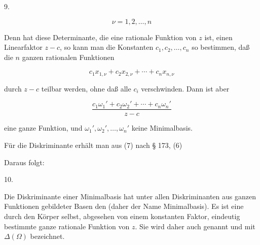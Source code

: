 9. 

\[
\nu = 1, 2, \ldots, n
\]




Denn hat diese Determinante, die eine rationale Funktion
von $z$ ist, einen Linearfaktor $z - c$, so kann man die Konstanten
$c_1, c_2, \ldots, c_n$ so bestimmen, daß die $n$ ganzen rationalen Funktionen


\[
c_1 x_{1,\nu} + c_2 x_{2,\nu} + \cdots + c_n x_{n,\nu}
\]

durch $z - c$ teilbar werden, ohne daß alle $c_i$ verschwinden.
Dann ist aber

\[
\frac{c_1 \omega_1' + c_2 \omega_2' + \cdots + c_n \omega_n'}{z - c}
\]

eine ganze Funktion, und $\omega_1', \omega_2', \ldots, \omega_n'$ keine Minimalbasis.

Für die Diskriminante erhält man aus (7) nach § 173, (6)


Daraus folgt:

10. 

Die Diskriminante einer Minimalbasis hat unter allen Diskriminanten
 aus ganzen Funktionen gebildeter Basen den  (daher der Name Minimalbasis). Es ist eine durch
den Körper selbst, abgesehen von einem konstanten Faktor,
eindeutig bestimmte ganze rationale Funktion von $z$. Sie wird
daher auch  genannt und
mit $\varDelta(\Omega)$ bezeichnet.
